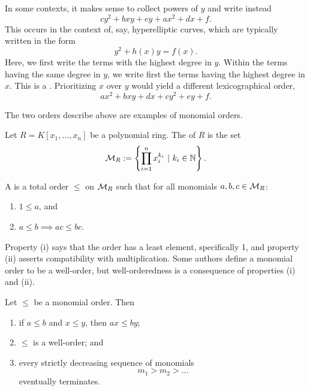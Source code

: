 In some contexts, it makes sense to collect powers of $y$ and write instead
  \[ cy^2 + bxy + ey + ax^2 + dx + f. \]
This occurs in the context of, say, hyperelliptic curves, which are typically written in the form
  \[ y^2 + h(x)y = f(x). \]
Here, we first write the terms with the highest degree in $y$.
Within the terms having the same degree in $y$, we write first the terms having the highest degree in $x$.
This is a .
Prioritizing $x$ over $y$ would yield a different lexicographical order,
  \[ ax^2 + bxy + dx + cy^2 + ey + f. \]

The two orders describe above are examples of monomial orders.
\begin{definition}
  Let $R = K[x_1, \ldots, x_n]$ be a polynomial ring.
  The  of $R$ is the set
  \begin{equation*}
    \cal M_R := \left\{ \prod_{i=1}^n x_i^{k_i} ~|~ k_i \in \bb N \right\}.
  \end{equation*}
  
  A  is a total order $\leq$ on $\cal M_R$ such that for all monomials $a, b, c \in \cal M_R$:
  \begin{enumerate}[label=(\roman*)]
    \item $1 \leq a$, and
    \item $a \leq b \implies ac \leq bc$.
  \end{enumerate}
\end{definition}
Property (i) says that the order has a least element, specifically 1, and property (ii) asserts compatibility with multiplication.
Some authors define a monomial order to be a well-order,
but well-orderedness is a consequence of properties (i) and (ii).
\begin{proposition}
  Let $\leq$ be a monomial order. Then
  \label{prop_monomial_order}
  \begin{enumerate}[label=(\roman*)]
    \item
      if $a \leq b$ and $x \leq y$, then $ax \leq by$;
    \item
      $\leq$ is a well-order; and
    \item
      every strictly decreasing sequence of monomials
      \[ m_1 > m_2 > \dots \]
      eventually terminates.
  \end{enumerate}
\end{proposition}
